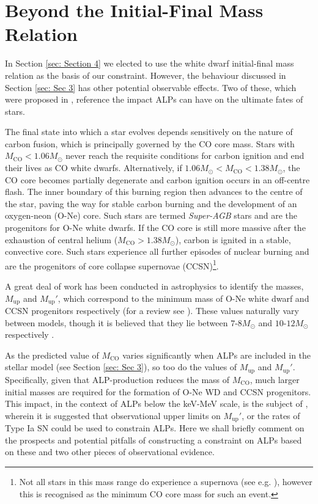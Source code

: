 \section{Beyond the Initial-Final Mass Relation}
\label{sec: Section 5}


In Section \ref{sec: Section 4} we elected to use the white dwarf initial-final mass relation as the basis of our constraint. However, the behaviour discussed in Section \ref{sec: Sec 3} has other potential observable effects. Two of these, which were proposed in \cite{Dominguez:2017mia}, reference the impact ALPs can have on the ultimate fates of stars.




The final state into which a star evolves depends sensitively on the nature of carbon fusion, which is principally governed by the CO core mass. Stars with $M_{\mathrm{CO}}<1.06M_{\odot}$ never reach the requisite conditions for carbon ignition and end their lives as CO white dwarfs. Alternatively, if $1.06M_{\odot}<M_{\mathrm{CO}}<1.38M_{\odot}$, the CO core becomes partially degenerate and carbon ignition occurs in an off-centre flash. The inner boundary of this burning region then advances to the centre of the star, paving the way for stable carbon burning and the development of an oxygen-neon (O-Ne) core. Such stars are termed \textit{Super-AGB} stars and are the progenitors for O-Ne white dwarfs. If the CO core is still more massive after the exhaustion of central helium ($M_{\mathrm{CO}}>1.38M_{\odot}$), carbon is ignited in a stable, convective core. Such stars experience all further episodes of nuclear burning and are the progenitors of core collapse supernovae (CCSN)\footnote{Not all stars in this mass range do experience a supernova (see e.g. \cite{2009ARA&A..47...63S}), however this is recognised as the minimum CO core mass for such an event.}.



A great deal of work has been conducted in astrophysics to identify the masses, $M_{\mathrm{up}}$ and $M_{\mathrm{up}}'$, which correspond to the minimum mass of O-Ne white dwarf and CCSN progenitors respectively (for a review see \cite{2009ARA&A..47...63S}). These values naturally vary between models, though it is believed that they lie between $7$-$8M_{\odot}$ and $10$-$12M_{\odot}$ respectively \cite{2012sse..book.....K}.



As the predicted value of $M_{\mathrm{CO}}$ varies significantly when ALPs are included in the stellar model (see Section \ref{sec: Sec 3}), so too do the values of $M_{\mathrm{up}}$ and $M_{\mathrm{up}}'$. Specifically, given that ALP-production reduces the mass of $M_{\mathrm{CO}}$, much larger initial masses are required for the formation of O-Ne WD and CCSN progenitors. This impact, in the context of ALPs below the keV-MeV scale, is the subject of \cite{Dominguez:2017mia}, wherein it is suggested that observational upper limits on $M_{\mathrm{up}}'$, or the rates of Type Ia SN could be used to constrain ALPs. Here we shall briefly comment on the prospects and potential pitfalls of constructing a constraint on ALPs based on these and two other pieces of observational evidence.



